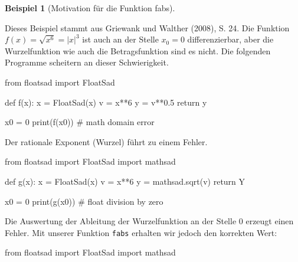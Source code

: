 \documentclass[
  a4paper,
  DIV=11]{scrreprt}
\newenvironment{Shaded}{\begin{snugshade}}{\end{snugshade}}
\newcommand{\BuiltInTok}[1]{\textcolor[rgb]{0.00,0.23,0.31}{#1}}
\newcommand{\CommentTok}[1]{\textcolor[rgb]{0.37,0.37,0.37}{#1}}
\newcommand{\ControlFlowTok}[1]{\textcolor[rgb]{0.00,0.23,0.31}{#1}}
\newcommand{\DecValTok}[1]{\textcolor[rgb]{0.68,0.00,0.00}{#1}}
\newcommand{\FloatTok}[1]{\textcolor[rgb]{0.68,0.00,0.00}{#1}}
\newcommand{\ImportTok}[1]{\textcolor[rgb]{0.00,0.46,0.62}{#1}}
\newcommand{\KeywordTok}[1]{\textcolor[rgb]{0.00,0.23,0.31}{#1}}
\newcommand{\NormalTok}[1]{\textcolor[rgb]{0.00,0.23,0.31}{#1}}
\newcommand{\OperatorTok}[1]{\textcolor[rgb]{0.37,0.37,0.37}{#1}}
\theoremstyle{definition}
\theoremstyle{definition}
\newtheorem{example}{Beispiel}[chapter]
\theoremstyle{remark}
\begin{document}
\begin{example}[Motivation für die Funktion
fabs]\protect\hypertarget{exm-fabsMotivation}{}\label{exm-fabsMotivation}

Dieses Beispiel stammt aus Griewank und Walther (2008), S. 24. Die
Funktion \(f(x) = \sqrt{x^6} = |x|^3\) ist auch an der Stelle \(x_0=0\)
differenzierbar, aber die Wurzelfunktion wie auch die Betragsfunktion
sind es nicht. Die folgenden Programme scheitern an dieser
Schwierigkeit.

\begin{Shaded}
\begin{Highlighting}[]
\ImportTok{from}\NormalTok{ floatsad }\ImportTok{import}\NormalTok{ FloatSad}

\KeywordTok{def}\NormalTok{ f(x):}
\NormalTok{    x }\OperatorTok{=}\NormalTok{ FloatSad(x)}
\NormalTok{    v }\OperatorTok{=}\NormalTok{ x}\OperatorTok{**}\DecValTok{6}
\NormalTok{    y }\OperatorTok{=}\NormalTok{ v}\OperatorTok{**}\FloatTok{0.5}
    \ControlFlowTok{return}\NormalTok{ y}

\NormalTok{x0 }\OperatorTok{=} \DecValTok{0}
\BuiltInTok{print}\NormalTok{(f(x0)) }\CommentTok{\# math domain error}
\end{Highlighting}
\end{Shaded}

Der rationale Exponent (Wurzel) führt zu einem Fehler.

\begin{Shaded}
\begin{Highlighting}[]
\ImportTok{from}\NormalTok{ floatsad }\ImportTok{import}\NormalTok{ FloatSad}
\ImportTok{import}\NormalTok{ mathsad}

\KeywordTok{def}\NormalTok{ g(x):}
\NormalTok{    x }\OperatorTok{=}\NormalTok{ FloatSad(x)}
\NormalTok{    v }\OperatorTok{=}\NormalTok{ x}\OperatorTok{**}\DecValTok{6}
\NormalTok{    y }\OperatorTok{=}\NormalTok{ mathsad.sqrt(v)}
    \ControlFlowTok{return}\NormalTok{ Y}

\NormalTok{x0 }\OperatorTok{=} \DecValTok{0}
\BuiltInTok{print}\NormalTok{(g(x0)) }\CommentTok{\# float division by zero}
\end{Highlighting}
\end{Shaded}

Die Auswertung der Ableitung der Wurzelfunktion an der Stelle 0 erzeugt
einen Fehler. Mit unserer Funktion \texttt{fabs} erhalten wir jedoch den
korrekten Wert:

\begin{Shaded}
\begin{Highlighting}[]
\ImportTok{from}\NormalTok{ floatsad }\ImportTok{import}\NormalTok{ FloatSad}
\ImportTok{import}\NormalTok{ mathsad}


\end{Highlighting}
\end{Shaded}
\end{example}
\end{document}
